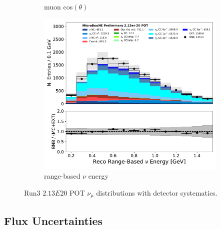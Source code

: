 \begin{figure}[H]
\begin{center}
\begin{subfigure}[b]{0.3\textwidth}
    \caption{\label{fig:detsys:numu:muontheta} muon cos$(\theta)$}
    \end{subfigure}
        \begin{subfigure}[b]{0.3\textwidth}
    \centering
    \includegraphics[width=1.00\textwidth]{NuMuCCsel/Images/Ryan/fullselection_run3_fullsystematics/reco_nu_e_range_v_07232020_fullsel_samples_detsys_event_category.pdf}
    \caption{\label{fig:detsys:numu:nurange} range-based $\nu$ energy}
    \end{subfigure}
\caption{\label{fig:detsys:numu}Run3 $2.13E20$ POT $\nu_{\mu}$ distributions with detector systematics.}
\end{center}
\end{figure}


\subsection{Flux Uncertainties }
\label{sec:systematics:flux}
%

